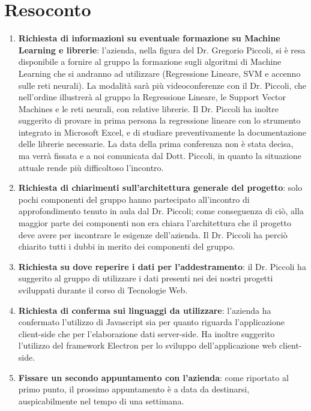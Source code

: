 \documentclass{article}
\begin{document}
\section{Resoconto}%
\label{resoconto}
\begin{enumerate}
  \item \textbf{Richiesta di informazioni su eventuale formazione su Machine Learning e librerie}: l'azienda, nella figura
  del Dr. Gregorio Piccoli, si è resa disponibile a fornire al gruppo la formazione
  sugli algoritmi di Machine Learning che si andranno ad utilizzare (Regressione Lineare, SVM e accenno sulle reti neurali).
  La modalità sarà più videoconferenze con il Dr. Piccoli, che nell'ordine illustrerà
  al gruppo la Regressione Lineare, le Support Vector Machines e le reti neurali, con relative librerie.
  Il Dr. Piccoli ha inoltre suggerito di provare in prima persona la regressione lineare con lo strumento
  integrato in Microsoft Excel, e di studiare preventivamente la documentazione delle librerie necessarie. La data
  della prima conferenza non è stata decisa, ma verrà fissata e a noi comunicata dal Dott. Piccoli, in quanto la situazione
  attuale rende più difficoltoso l'incontro.
  \item \textbf{Richiesta di chiarimenti sull'architettura generale del progetto}: solo pochi componenti del gruppo hanno
  partecipato all'incontro di approfondimento tenuto in aula dal Dr. Piccoli; come conseguenza di ciò,
  alla maggior parte dei componenti non era chiara l'architettura che il progetto deve avere per incontrare le
  esigenze dell'azienda. Il Dr. Piccoli ha perciò chiarito tutti i dubbi in merito dei componenti del gruppo.
  \item \textbf{Richiesta su dove reperire i dati per l'addestramento}: il Dr. Piccoli ha suggerito al gruppo di utilizzare
  i dati presenti nei  dei nostri progetti sviluppati durante il corso di Tecnologie Web.
  \item \textbf{Richiesta di conferma sui linguaggi da utilizzare}: l'azienda ha confermato l'utilizzo di Javascript sia per
  quanto riguarda l'applicazione client-side che per l'elaborazione dati server-side. Ha inoltre suggerito
  l'utilizzo del framework Electron per lo sviluppo dell'applicazione web client-side.
  \item \textbf{Fissare un secondo appuntamento con l'azienda}: come riportato al primo punto, il prossimo appuntamento è a
  data da destinarsi, auspicabilmente  nel tempo di una settimana.
\end{enumerate}
\end{document}

